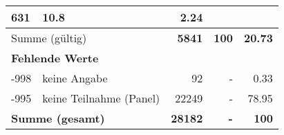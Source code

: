 \begin{longtable}{lXrrr}
       \num{631} &
       \num[round-mode=places,round-precision=2]{10,8} &
         \num[round-mode=places,round-precision=2]{2,24} \\
     \midrule
     \multicolumn{2}{l}{Summe (gültig)} &
       \textbf{\num{5841}} &
     \textbf{100} &
       \textbf{\num[round-mode=places,round-precision=2]{20,73}} \\
     \multicolumn{5}{l}{\textbf{Fehlende Werte}}\\
       -998 &
       keine Angabe &
         \num{92} &
        - &
         \num[round-mode=places,round-precision=2]{0,33} \\
       -995 &
       keine Teilnahme (Panel) &
         \num{22249} &
        - &
         \num[round-mode=places,round-precision=2]{78,95} \\
     \midrule
     \multicolumn{2}{l}{\textbf{Summe (gesamt)}} &
          \textbf{\num{28182}} &
        \textbf{-} &
        \textbf{100} \\
     \bottomrule
     \end{longtable}
     
